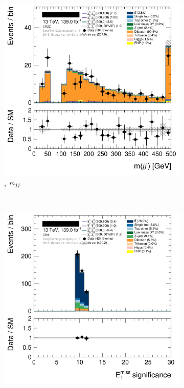 \begin{figure}[tp]
\begin{subfigure}{0.48\textwidth}
\includegraphics[width=\textwidth]{figures/2ljets_def_mjj_CRZZ.png}
\caption{\crvz, $m_{jj}$}
\end{subfigure}
\\[0.5em]
\begin{subfigure}{0.48\textwidth}
\centering
\includegraphics[width=\textwidth]{figures/2ljets_def_met_Sign_CRtt.png}

\end{subfigure}
\end{figure}
